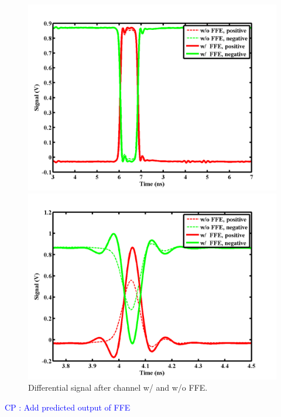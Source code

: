 \documentclass{book}  %
\newcommand{\cphighlight}[1]{\Huge\textcolor{blue}{CP : #1}\normalsize}
\begin{document}
\begin{paper}
\begin{figure}[htbp!]	
	\ContinuedFloat
	\begin{minipage}[tb]{0.5\textwidth}
		\centering	
		\includegraphics[width=\textwidth]{./img/Verilog/3G/2.png}
	\end{minipage}%
	\begin{minipage}[tb]{0.5\textwidth}
		\centering	
		\includegraphics[width=\textwidth]{./img/Verilog/20G/2.png}
	\end{minipage}%
	\caption{Differential signal after channel w/ and w/o FFE.}
\end{figure}


\cphighlight{Add predicted output of FFE}



\end{paper}
\end{document}
